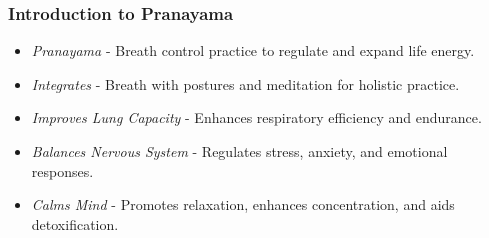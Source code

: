 \begin{frame}[fragile]\frametitle{Introduction to Pranayama}

  \begin{itemize}
	\item \textit{Pranayama} - Breath control practice to regulate and expand life energy.
	\item \textit{Integrates} - Breath with postures and meditation for holistic practice.
	\item \textit{Improves Lung Capacity} - Enhances respiratory efficiency and endurance.
	\item \textit{Balances Nervous System} - Regulates stress, anxiety, and emotional responses.
	\item \textit{Calms Mind} - Promotes relaxation, enhances concentration, and aids detoxification.
  \end{itemize}

\end{frame}





